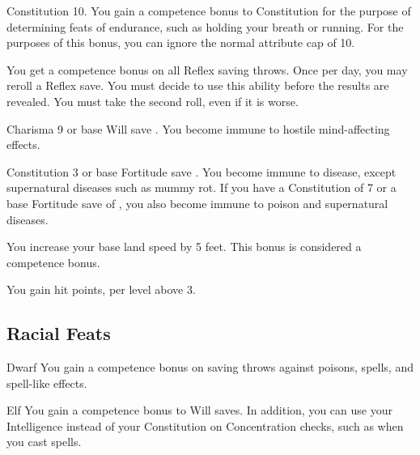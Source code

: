 \featpre Constitution 10.
\featben You gain a  competence bonus to Constitution for the purpose of determining feats of endurance, such as holding your breath or running. For the purposes of this bonus, you can ignore the normal attribute cap of 10.


 You get a  competence bonus on all Reflex saving throws. Once per day, you may reroll a Reflex save. You must decide to use this ability before the results are revealed. You must take the second roll, even if it is worse.

\featpre Charisma 9 or base Will save .
\featben You become immune to hostile mind-affecting effects.

\featpre Constitution 3 or base Fortitude save .
\featben You become immune to disease, except supernatural diseases such as mummy rot. If you have a Constitution of 7 or a base Fortitude save of , you also become immune to poison and supernatural diseases.


 You increase your base land speed by 5 feet. This bonus is considered a competence bonus.

 You gain  hit points,  per level above 3.

\subsection{Racial Feats}

 Dwarf
 You gain a  competence bonus on saving throws against poisons, spells, and spell-like effects.

 Elf
 You gain a  competence bonus to Will saves. In addition, you can use your Intelligence instead of your Constitution on Concentration checks, such as when you cast spells.

